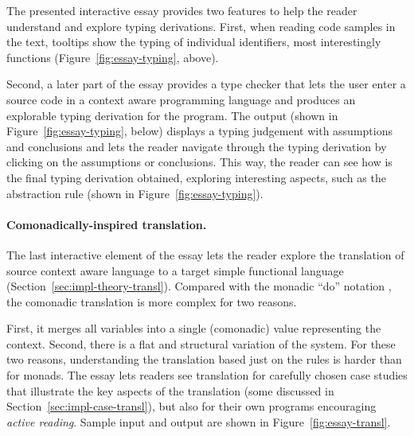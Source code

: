The presented interactive essay provides two features to help the reader understand and explore
typing derivations. First, when reading code samples in the text, tooltips show the typing of
individual identifiers, most interestingly functions (Figure~\ref{fig:essay-typing}, above).

Second, a later part of the essay provides a type checker that lets the user enter a source code
in a context aware programming language and produces an explorable typing derivation for the
program. The output (shown in Figure~\ref{fig:essay-typing}, below) displays a typing judgement
with assumptions and conclusions and lets the reader navigate through the typing derivation by
clicking on the assumptions or conclusions. This way, the reader can see how is the final typing
derivation obtained, exploring interesting aspects, such as the abstraction rule (shown in
Figure~\ref{fig:essay-typing}).

\paragraph{Comonadically-inspired translation.}

The last interactive element of the essay lets the reader explore the translation of source
context aware language to a target simple functional language (Section~\ref{sec:impl-theory-transl}).
Compared with the monadic ``do'' notation \cite{other-haskell98}, the comonadic translation is more
complex for two reasons.

First, it merges all variables into a single (comonadic) value representing
the context. Second, there is a flat and structural variation of the system. For these two reasons,
understanding the translation based just on the rules is harder than for monads. The essay lets
readers see translation for carefully chosen case studies that illustrate the key aspects of the
translation (some discussed in Section~\ref{sec:impl-case-transl}), but also for their own
programs encouraging \emph{active reading}. Sample input and output are shown in
Figure~\ref{fig:essay-transl}.


